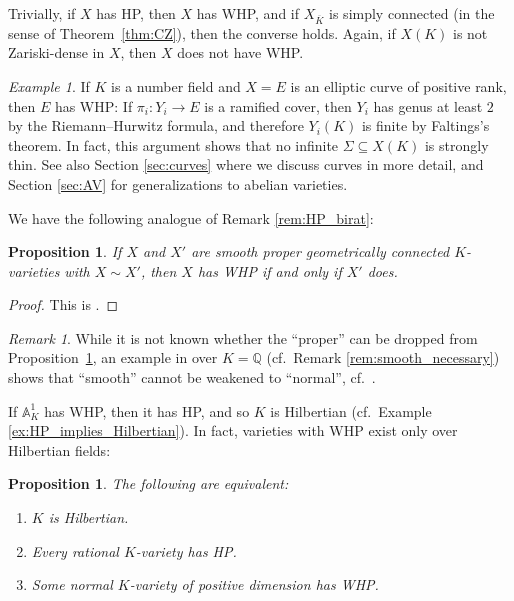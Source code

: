 \documentclass[10pt,a4paper]{amsart}
\theoremstyle{plain}
\newtheorem{proposition}[theorem]{Proposition}
\theoremstyle{remark}
\newtheorem{remark}[theorem]{Remark}
\newtheorem{example}[theorem]{Example}
\numberwithin{theorem}{section}
\begin{document}
Trivially, if $X$ has HP, then $X$ has WHP,
and if $X_{\overline{K}}$ is simply connected (in the sense of Theorem~\ref{thm:CZ}), then the converse holds.
Again, if $X(K)$ is not Zariski-dense in $X$, then $X$ does not have WHP.

\begin{example}\label{ex:E_WHP}
If $K$ is a number field and $X=E$ is an elliptic curve of positive rank, then $E$ has WHP:
If $\pi_i\colon Y_i\rightarrow E$ is a ramified cover, then $Y_i$ has genus at least $2$ by the Riemann--Hurwitz formula,
and therefore $Y_i(K)$ is finite by Faltings's theorem.
In fact, this argument shows that no infinite $\Sigma\subseteq X(K)$ is strongly thin.
See also Section \ref{sec:curves} where we discuss curves in more detail,
and Section \ref{sec:AV} for generalizations to abelian varieties.
\end{example}
  

We have the following analogue of Remark \ref{rem:HP_birat}:

\begin{proposition}\label{prop:WHP_birat}
If $X$ and $X'$ are smooth proper geometrically connected $K$-varieties with $X\sim X'$,
then $X$ has WHP if and only if $X'$ does.
\end{proposition}

\begin{proof}
This is \cite[Prop.~3.1]{CDJLZ}.  
\end{proof}

\begin{remark}\label{rem:WHP_birat}
While it is not known whether the ``proper'' can be dropped from Proposition~\ref{prop:WHP_birat},
an example in \cite{CZ} over $K=\mathbb{Q}$ (cf.~Remark \ref{rem:smooth_necessary}) shows that ``smooth'' cannot be weakened to ``normal'',
cf.~\cite[Remark 7.11]{BJL}.
\end{remark}

If $\mathbb{A}^1_K$ has WHP, then it has HP, and so $K$ is Hilbertian (cf.~Example \ref{ex:HP_implies_Hilbertian}).
In fact, varieties with WHP exist only over Hilbertian fields:

\begin{proposition}\label{prop:WHP_implies_Hilbertian}
The following are equivalent:
\begin{enumerate}
    \item $K$ is Hilbertian.
    \item Every rational $K$-variety has HP.
    \item Some normal $K$-variety of positive dimension has WHP.  
\end{enumerate}
\end{proposition}
\end{document}
